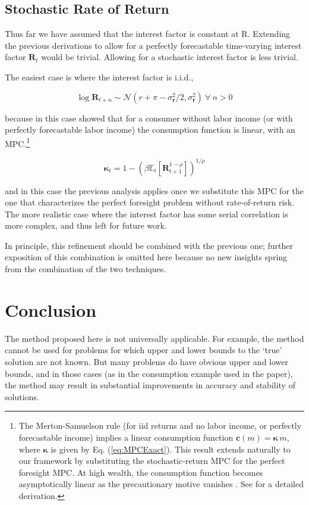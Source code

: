 \documentclass[twocolumn, switch]{article}
\newcommand{\CRRA}{\rho}
\newcommand{\Ex}{\mathbf{\mathbb{E}}}
\newcommand{\DiscFac}{\beta}
\newcommand{\Rfree}{\text{R}}
\newcommand{\mNrm}{m}
\newcommand{\cFunc}{\mathbf{c}}
\newcommand{\MPC}{\boldsymbol{\kappa}}
\newcommand{\Risky}{\mathbf{R}}
\newcommand{\Nrml}{\mathcal{N}}
\newcommand{\std}{\sigma}
\newcommand{\risky}{\mathbf{r}}
\begin{document}
\subsection{Stochastic Rate of Return}

Thus far we have assumed that the interest factor is constant at $\Rfree$.
Extending the previous derivations to allow for a perfectly forecastable
time-varying interest factor $\Risky_{t}$ would be trivial. Allowing for a
stochastic interest factor is less trivial.

The easiest case is where the interest factor is i.i.d.,

\begin{equation}
\label{eq:distRisky}
\log \Risky_{t+n} \sim \Nrml(r + \pi - \std^{2}_{\risky}/2,\std^{2}_{\risky}) ~\forall~n>0
\end{equation}

because in this case \citet{Samuelson1969, Merton1969, Merton1971}
showed that for a consumer without labor income (or with perfectly forecastable
labor income) the consumption function is linear, with an MPC.\footnote{The Merton-Samuelson rule (for iid returns and no labor income, or perfectly forecastable income)
implies a linear consumption function $\cFunc(\mNrm) = \MPC\,\mNrm$, where $\MPC$ is given by
Eq. (\ref{eq:MPCExact}). This result extends naturally to our framework by substituting the
stochastic-return MPC for the perfect foresight MPC. At high wealth, the consumption function becomes asymptotically linear as the precautionary motive vanishes \citep{BBZ2016SkewedWealth}. See \citet{CRRA-RateRisk} for a detailed derivation.}

\begin{equation}
\label{eq:MPCExact}
\MPC_{t} = 1- \left(\DiscFac  \Ex_{t}[\Risky_{t+1}^{1-\CRRA}]\right)^{1/\CRRA}
\end{equation}

and in this case the previous analysis applies once we substitute this MPC for
the one that characterizes the perfect foresight problem without rate-of-return
risk. The more realistic case where the interest factor has some serial
correlation is more complex, and thus left for future work.

In principle, this refinement should be combined with the previous one; further
exposition of this combination is omitted here because no new insights spring
from the combination of the two techniques.

\section{Conclusion}

The method proposed here is not universally applicable. For example, the method
cannot be used for problems for which upper and lower bounds to the `true'
solution are not known. But many problems do have obvious upper and lower
bounds, and in those cases (as in the consumption example used in the paper),
the method may result in substantial improvements in accuracy and stability of
solutions.




\end{document}
